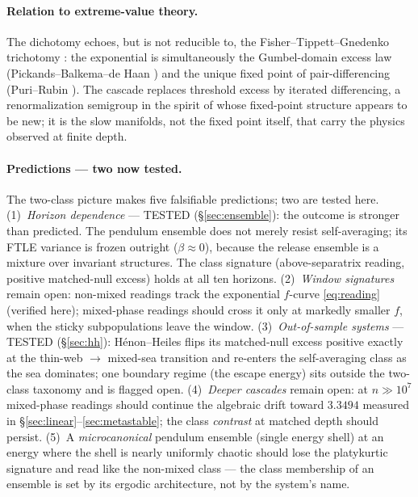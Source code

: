 \documentclass[11pt,a4paper]{article}
\theoremstyle{remark}
\begin{document}
\paragraph{Relation to extreme-value theory.} The dichotomy echoes, but is not reducible to, the
Fisher--Tippett--Gnedenko trichotomy \cite{fisher,gnedenko,embrechts}: the exponential is
simultaneously the Gumbel-domain excess law (Pickands--Balkema--de Haan \cite{pickands,balkema}) and
the unique fixed point of pair-differencing (Puri--Rubin \cite{purirubin}). The cascade replaces
threshold excess by iterated differencing, a renormalization semigroup in the spirit of
\cite{feigenbaum} whose fixed-point structure appears to be new; it is the slow manifolds, not the
fixed point itself, that carry the physics observed at finite depth.

\paragraph{Predictions --- two now tested.} The two-class picture makes five falsifiable predictions;
two are tested here.
(1)~\emph{Horizon dependence} --- TESTED (\S\ref{sec:ensemble}): the outcome is stronger than
predicted. The pendulum ensemble does not merely resist self-averaging; its FTLE variance is
frozen outright ($\beta \approx 0$), because the release ensemble is a mixture over invariant
structures. The class signature (above-separatrix reading, positive matched-null excess) holds at
all ten horizons.
(2)~\emph{Window signatures} remain open: non-mixed readings track the exponential $f$-curve
\eqref{eq:reading} (verified here); mixed-phase readings should cross it only at markedly smaller
$f$, when the sticky subpopulations leave the window.
(3)~\emph{Out-of-sample systems} --- TESTED (\S\ref{sec:hh}): H\'enon--Heiles flips its
matched-null excess positive exactly at the thin-web $\to$ mixed-sea transition and re-enters the
self-averaging class as the sea dominates; one boundary regime (the escape energy) sits outside
the two-class taxonomy and is flagged open.
(4)~\emph{Deeper cascades} remain open: at $n \gg 10^{7}$ mixed-phase readings should continue the
algebraic drift toward $3.3494$ measured in \S\ref{sec:linear}--\ref{sec:metastable}; the class
\emph{contrast} at matched depth should persist.
(5)~A \emph{microcanonical} pendulum ensemble (single energy shell) at an
energy where the shell is nearly uniformly chaotic should lose the platykurtic signature and read
like the non-mixed class --- the class membership of an ensemble is set by its ergodic
architecture, not by the system's name.
\end{document}
